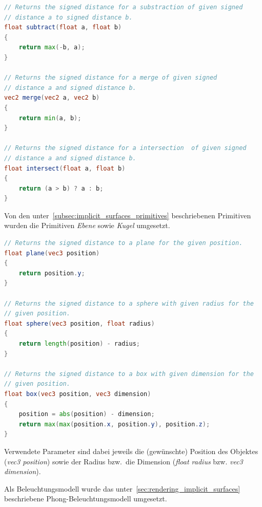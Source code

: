 \begin{lstlisting}[language=GLSL,caption={Umsetzung der Operationen
        \textit{Vereinigung}, \textit{Subtraktion} sowie
        \textit{Intersektion} für implizite Oberflächen in
        GLSL.},label={alg:glsl_ops},captionpos=b,emph={subtract,merge,intersect}]
// Returns the signed distance for a substraction of given signed
// distance a to signed distance b.
float subtract(float a, float b)
{
    return max(-b, a);
}

// Returns the signed distance for a merge of given signed
// distance a and signed distance b.
vec2 merge(vec2 a, vec2 b)
{
    return min(a, b);
}

// Returns the signed distance for a intersection  of given signed
// distance a and signed distance b.
float intersect(float a, float b)
{
    return (a > b) ? a : b;
}
\end{lstlisting}

Von den unter~\autoref{subsec:implicit_surfaces_primitives} beschriebenen
Primitiven wurden die Primitiven \textit{Ebene} sowie \textit{Kugel} umgesetzt.

\begin{lstlisting}[language=GLSL,caption={Umsetzung der Primitiven
        \textit{Ebene} und \textit{Kugel} in Form von impliziten
        Oberflächen in
        GLSL.},label={alg:glsl_primitives},captionpos=b,emph={plane,sphere,box}]
// Returns the signed distance to a plane for the given position.
float plane(vec3 position)
{
    return position.y;
}

// Returns the signed distance to a sphere with given radius for the
// given position.
float sphere(vec3 position, float radius)
{
    return length(position) - radius;
}

// Returns the signed distance to a box with given dimension for the
// given position.
float box(vec3 position, vec3 dimension)
{
    position = abs(position) - dimension;
    return max(max(position.x, position.y), position.z);
}
\end{lstlisting}

Verwendete Parameter sind dabei jeweils die (gewünschte) Position des Objektes
(\textit{vec3 position}) sowie der Radius bzw.\ die Dimension
(\textit{float radius} bzw. \textit{vec3 dimension}).

Als Beleuchtungsmodell wurde das
unter~\autoref{sec:rendering_implicit_surfaces} beschriebene
Phong-Beleuchtungsmodell umgesetzt.

